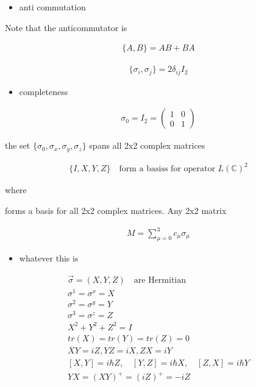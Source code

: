 \documentclass[
]{article}
\providecommand{\tightlist}{%
  \setlength{\itemsep}{0pt}\setlength{\parskip}{0pt}}
\begin{document}
\begin{itemize}
	\tightlist
	\item
	      anti commutation
\end{itemize}

Note that the anticommutator is

\begin{gather*}
	\{A,B\}=AB+BA
\end{gather*}

\begin{gather*}
	\{\sigma_i,\sigma_j\}=2\delta_{ij}I_2
\end{gather*}

\begin{itemize}
	\tightlist
	\item
	      completeness
\end{itemize}

\begin{gather*}
	\sigma_0=I_2=\begin{pmatrix}1 & 0\\ 0 & 1\end{pmatrix}
\end{gather*}

the set \(\{\sigma_0,\sigma_x,\sigma_y,\sigma_z\}\) spans all 2x2
complex matrices

\begin{gather*}
	\{I,X,Y,Z\}\quad\text{form a basiss for operator }L(\mathbb{C})^2
\end{gather*}

where

forms a basis for all 2x2 complex matrices. Any 2x2 matrix

\begin{gather*}
	M=\sum_{\mu=0}^3c_\mu\sigma_\mu
\end{gather*}

\begin{itemize}
	\tightlist
	\item
	      whatever this is
\end{itemize}

\begin{gather*}
	\vec{\sigma}=(X,Y,Z)\quad\text{are Hermitian}\\
	\sigma^1=\sigma^x=X\\
	\sigma^2=\sigma^y=Y\\
	\sigma^3=\sigma^z=Z\\
	X^2+Y^2+Z^2=I\\
	tr(X)=tr(Y)=tr(Z)=0\\
	XY=iZ, YZ=iX, ZX=iY\\
	[X, Y] = i\hbar Z, \quad [Y, Z] = i\hbar X, \quad [Z, X] = i\hbar Y\\
	YX=(XY)^+=(iZ)^+=-iZ
\end{gather*}
\end{document}
